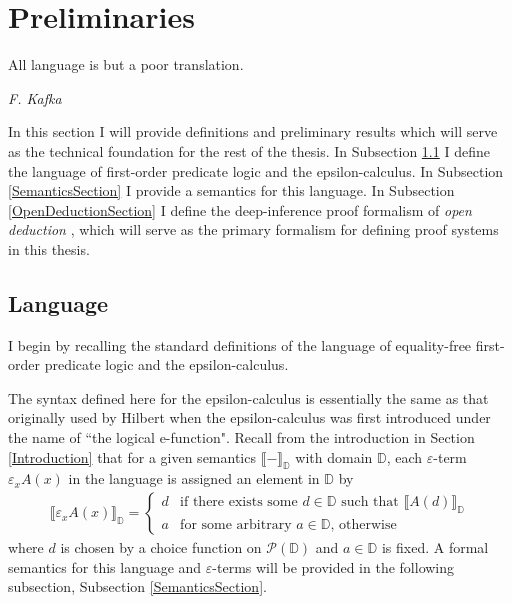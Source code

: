 \documentclass[10pt]{article}
\theoremstyle{definition}\newtheorem{remark}[theorem]{Remark}
\theoremstyle{definition}\newtheorem{example}[theorem]{Example}
\theoremstyle{definition}\newtheorem{definition}[theorem]{Definition}
\begin{document}
	\pagebreak
	
	\section{Preliminaries}\label{PreliminariesSection}
	
	\epigraph{All language is but a poor translation.}{\textit{F. Kafka}}
	
	\noindent In this section I will provide definitions and preliminary results which will serve as the technical foundation for the rest of the thesis. In Subsection \ref{LanguageSection} I define the language of first-order predicate logic and the epsilon-calculus. In Subsection \ref{SemanticsSection} I provide a semantics for this language. In Subsection \ref{OpenDeductionSection} I define the deep-inference proof formalism of \textit{open deduction} \cite{GuglielmiGundersenParigotOpenDeduction}, which will serve as the primary formalism for defining proof systems in this thesis.
	
	\subsection{Language}\label{LanguageSection}
	
	I begin by recalling the standard definitions of the language of equality-free first-order predicate logic and the epsilon-calculus.
	
	The syntax defined here for the epsilon-calculus is essentially the same as that originally used by Hilbert \cite{HilbertFoundations} when the epsilon-calculus was first introduced under the name of ``the logical e-function". Recall from the introduction in Section \ref{Introduction} that for a given semantics $\llbracket - \rrbracket_{\mathbb{D}}$ with domain $\mathbb{D}$, each $\varepsilon$-term $\varepsilon_x A(x)$ in the language is assigned an element in $\mathbb{D}$ by
	\begin{gather*}
		\llbracket \varepsilon_x A(x) \rrbracket_{\mathbb{D}} = \begin{cases}
			d & \text{if there exists some $d \in \mathbb{D}$ such that $\llbracket A(d) \rrbracket_\mathbb{D}$} \\
			a & \text{for some arbitrary $a \in \mathbb{D}$, otherwise}
		\end{cases}
	\end{gather*}
	where $d$ is chosen by a choice function on $\mathcal{P}(\mathbb{D})$ and $a \in \mathbb{D}$ is fixed. A formal semantics for this language and $\varepsilon$-terms will be provided in the following subsection, Subsection \ref{SemanticsSection}.
	
\end{document}

